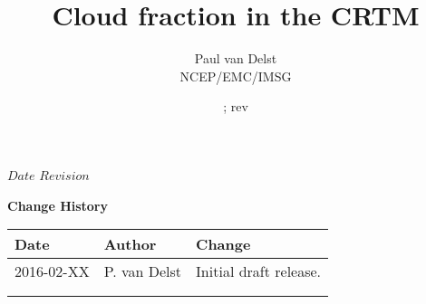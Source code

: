 




\SVN $Date$
\SVN $Revision$

\title{Cloud fraction in the CRTM}
\author{Paul van Delst\\NCEP/EMC/IMSG}
\date{\SVNDate ; rev\SVNRevision}



\maketitle

\draftwatermark



\thispagestyle{empty}
\vspace*{10cm}
\begin{center}
  {\sffamily\Large\bfseries Change History}
  \begin{table}[htp]
    \centering
    \begin{tabular}{|p{2cm}|p{3cm}|p{8cm}|}
      \hline
      \sffamily\textbf{Date} & \sffamily\textbf{Author} & \sffamily\textbf{Change}\\
      \hline\hline
      2016-02-XX & P. van Delst & Initial draft release.\\
      \hline
       &  &  \\
       &  &  \\
      \hline
      \hline
    \end{tabular}
  \end{table}
\end{center}
\clearpage

\pagestyle{fancy}
\fancyhead[LE,RO]{\sffamily \rightmark}
\fancyhead[LO,RE]{\sffamily \leftmark}

\setcounter{page}{1}
  \tableofcontents\newpage
  \listoffigures\newpage
  
\setcounter{page}{1}






\clearpage



\begin{appendix}
  
\end{appendix}



